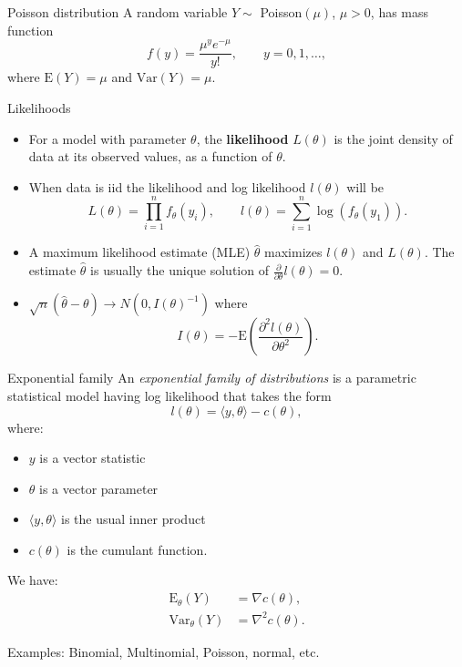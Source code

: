 \documentclass[
  ignorenonframetext,
]{beamer}
\providecommand{\tightlist}{%
  \setlength{\itemsep}{0pt}\setlength{\parskip}{0pt}}
\begin{document}
\begin{frame}{Poisson distribution}
\protect\hypertarget{poisson-distribution}{}
A random variable \(Y \sim\) Poisson\((\mu)\), \(\mu > 0\), has mass
function \[
  f(y) = \frac{\mu^y e^{-\mu}}{y!},  \qquad y = 0,1,\ldots,
\] where \(\text{E}(Y) = \mu\) and \(\text{Var}(Y) = \mu\).
\end{frame}

\begin{frame}{Likelihoods}
\protect\hypertarget{likelihoods}{}
\begin{itemize}
\item
  For a model with parameter \(\theta\), the \textbf{likelihood}
  \(L(\theta)\) is the joint density of data at its observed values, as
  a function of \(\theta\).
\item
  When data is iid the likelihood and log likelihood \(l(\theta)\) will
  be \[
  L(\theta) = \prod_{i=1}^n f_\theta(y_i), \qquad 
    l(\theta) = \sum_{i=1}^n \log(f_\theta(y_1)).
  \]
\item
  A maximum likelihood estimate (MLE) \(\hat\theta\) maximizes
  \(l(\theta)\) and \(L(\theta)\). The estimate \(\hat\theta\) is
  usually the unique solution of
  \(\frac{\partial}{\partial\theta}l(\theta) = 0\).
\item
  \(\sqrt{n}(\hat\theta - \theta) \to N(0, I(\theta)^{-1})\) where \[
  I(\theta) = -\text{E}\left(\frac{\partial^2 l(\theta)}{\partial \theta^2}\right).
  \]
\end{itemize}
\end{frame}

\begin{frame}{Exponential family}
\protect\hypertarget{exponential-family}{}
An \emph{exponential family of distributions} is a parametric
statistical model having log likelihood that takes the form
\begin{equation} \label{expolog}
    l(\theta) = \langle y,\theta \rangle - c(\theta),
\end{equation} where:

\begin{itemize}
\tightlist
\item
  \(y\) is a vector statistic
\item
  \(\theta\) is a vector parameter
\item
  \(\langle y,\theta \rangle\) is the usual inner product
\item
  \(c(\theta)\) is the cumulant function.
\end{itemize}

We have: \begin{align*}
  \text{E}_\theta(Y) &= \nabla c(\theta), \\  
  \text{Var}_\theta(Y) &= \nabla^2 c(\theta).
\end{align*}

Examples: Binomial, Multinomial, Poisson, normal, etc.
\end{frame}
\end{document}
